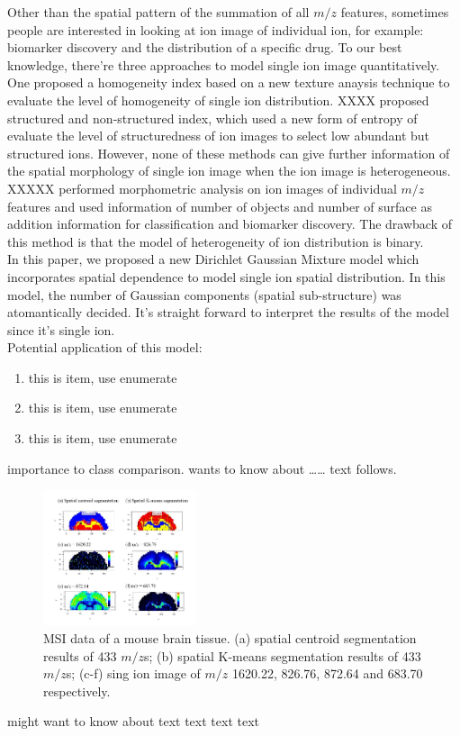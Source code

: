 \documentclass{bioinfo}
\begin{document}
Other than the spatial pattern of the summation of all $m/z$ features, sometimes people are interested in looking at ion image of individual ion, for example: biomarker discovery and the distribution of a specific drug. To our best knowledge, there're three approaches to model single ion image quantitatively. 
One proposed a homogeneity index based on a new texture anaysis technique to evaluate the level of homogeneity of single ion distribution.
XXXX proposed structured and non-structured index, which used a new form of entropy of evaluate the level of structuredness of ion images to select low abundant but structured ions.
However, none of these methods can give further information of  the spatial morphology of single ion image when the ion image is heterogeneous.
XXXXX performed morphometric analysis on ion images of individual $m/z$ features and used information of number of objects and number of surface as addition information for classification and biomarker discovery. The drawback of this method is that the model of heterogeneity of ion distribution is binary. \\
In this paper, we proposed a new Dirichlet Gaussian Mixture model which incorporates spatial dependence to model single ion spatial distribution. In this model, the number of Gaussian components (spatial sub-structure) was atomantically decided. It's straight forward to interpret the results of the model since it's single ion.\\
Potential application of this model:
\begin{enumerate}
\item this is item, use enumerate
\item this is item, use enumerate
\item this is item, use enumerate
\end{enumerate}

importance to class comparison.
  \citep{Bag01} wants to know about
{\ldots}{\ldots} text follows.

\begin{figure}[b!]
    \centering
	\includegraphics[width=0.4\textwidth]{figure1.jpg}
    \caption{ MSI data of a mouse brain tissue. (a) spatial centroid segmentation results of 433 $m/z$s; (b) spatial K-means segmentation results of 433 $m/z$s; (c-f) sing ion image of $m/z$ 1620.22, 826.76, 872.64 and 683.70 respectively.}
    \label{fig:figure1}
\end{figure}
\citealp{Boffelli03} might want to know about text text text
text\vspace*{1pt}
\end{document}
